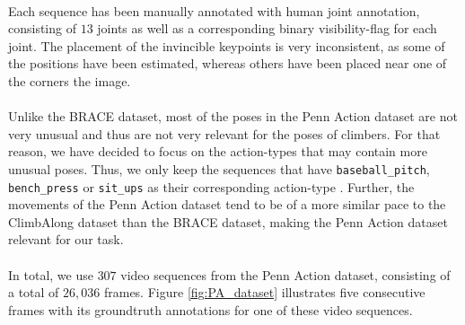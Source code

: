 \documentclass[./main.tex]{subfiles}
\begin{document}
\\
Each sequence has been manually annotated with human joint annotation, consisting of $13$ joints as well as a corresponding binary visibility-flag for each joint. The placement of the invincible keypoints is very inconsistent, as some of the positions have been estimated, whereas others have been placed near one of the corners the image.
\\
\\
Unlike the BRACE dataset, most of the poses in the Penn Action dataset are not very unusual and thus are not very relevant for the poses of climbers. For that reason, we have decided to focus on the action-types that may contain more unusual poses. Thus, we only keep the sequences that have \texttt{baseball\_pitch}, \texttt{bench\_press} or \texttt{sit\_ups} as their corresponding action-type \cite{penn_action}. Further, the movements of the Penn Action dataset tend to be of a more similar pace to the ClimbAlong dataset than the BRACE dataset, making the Penn Action dataset relevant for our task.
\\
\\
In total, we use $307$ video sequences from the Penn Action dataset, consisting of a total of $26,036$ frames. Figure \ref{fig:PA_dataset} illustrates five consecutive frames with its groundtruth annotations for one of these video sequences.
\end{document}
